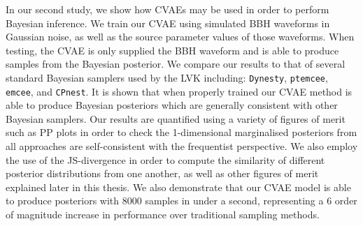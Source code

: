 %
%
In our second study, we show how \acp{CVAE} may be used in order 
to perform Bayesian inference. We train our \ac{CVAE} using simulated 
\ac{BBH} waveforms in Gaussian noise, as well as the source parameter 
values of those waveforms. When testing, the \ac{CVAE} is only supplied 
the \ac{BBH} waveform and is able to produce samples from the 
Bayesian posterior. We compare our results to that of several standard 
Bayesian samplers used by the \ac{LVK} including: \texttt{Dynesty}, 
\texttt{ptemcee}, \texttt{emcee}, and \texttt{CPnest}. It is shown that 
when properly trained our \ac{CVAE} method is able to produce Bayesian 
posteriors which are generally consistent with other Bayesian samplers. Our results 
are quantified using a variety of figures of merit such as \ac{PP} plots 
in order to check the 1-dimensional marginalised posteriors from all 
approaches are self-consistent with the frequentist perspective. We also 
employ the use of the \ac{JS}-divergence in order to compute the similarity 
of different posterior distributions from one another, as well as other 
figures of merit explained later in this thesis. We also demonstrate that our 
\ac{CVAE} model is able to produce posteriors with $8000$ samples in under 
a second, representing a $6$ order of magnitude increase in performance 
over traditional sampling methods. 

